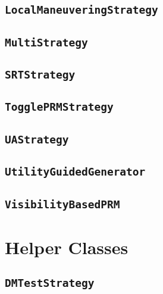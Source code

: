 \subsection{\texttt{LocalManeuveringStrategy}}

\subsection{\texttt{MultiStrategy}}

\subsection{\texttt{SRTStrategy}}

\subsection{\texttt{TogglePRMStrategy}}

\subsection{\texttt{UAStrategy}}

\subsection{\texttt{UtilityGuidedGenerator}}

\subsection{\texttt{VisibilityBasedPRM}}

\section{Helper Classes}

\subsection{\texttt{DMTestStrategy}}

